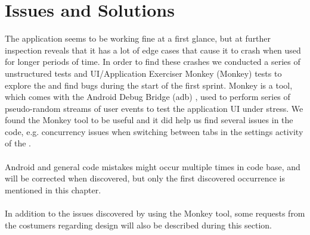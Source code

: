 
\chapter{Issues and Solutions}
\label{sec:sprintone_issues_solutions}
The \launcher application seems to be working fine at a first glance, but at further inspection reveals that it has a lot of edge cases that cause it to crash when used for longer periods of time. In order to find these crashes we conducted a series of unstructured tests and UI/Application Exerciser Monkey (Monkey) \parencite{android_monkey} tests to explore the \launcher and find bugs during the start of the first sprint. Monkey is a tool, which comes with the Android Debug Bridge (adb) \parencite{android_adb}, used to perform series of pseudo-random streams of user events to test the application UI under stress. We found the Monkey tool to be useful and it did help us find several issues in the code, e.g. concurrency issues when switching between tabs in the settings activity of the \launcher.
\\\\
Android and general code mistakes might occur multiple times in code base, and will be corrected when discovered, but only the first discovered occurrence is mentioned in this chapter. 
\\\\
In addition to the issues discovered by using the Monkey tool, some requests from the costumers regarding design will also be described during this section.





















